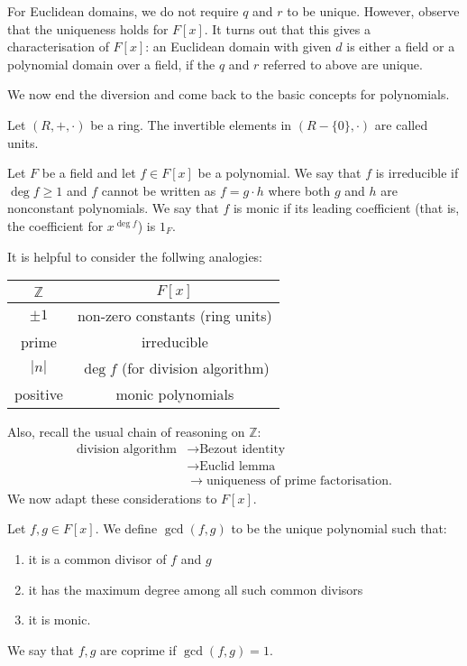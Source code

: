 \documentclass{scrartcl}
\def\ge{\geqslant}
\def\Z{\mathbb{Z}}
\begin{document}
\begin{remark}
	For Euclidean domains, we do not require $q$ and $r$ to be unique. However, observe that the uniqueness holds for $F[x]$. It turns out that this gives a characterisation of $F[x]$: an Euclidean domain with given $d$ is either a field or a polynomial domain over a field, if the $q$ and $r$ referred to above are unique. 
\end{remark} 
We now end the diversion and come back to the basic concepts for polynomials. 
\begin{definition}
	Let $(R, +, \cdot)$ be a ring. The invertible elements in $(R-\{0\}, \cdot)$ are called units. 
\end{definition}
\begin{definition}
	Let $F$ be a field and let $f \in F[x]$ be a polynomial. We say that $f$ is irreducible if $\deg{f} \ge 1$ and $f$ cannot be written as $f= g\cdot h$ where both $g$ and $h$ are nonconstant polynomials. We say that $f$ is monic if its leading coefficient (that is, the coefficient for $x^{\deg f}$) is $1_F$. 
\end{definition}
It is helpful to consider the follwing analogies:
\begin{center}
	\begin{tabular}{ c|c } 
		$\Z$ & $F[x]$ \\
		\hline
		$\pm 1$ & non-zero constants (ring units) \\ 
		prime & irreducible \\ 
		$|n|$ & $\deg{f}$ (for division algorithm) \\ 
		positive & monic polynomials
	\end{tabular}
\end{center}
Also, recall the usual chain of reasoning on $\Z$:
\begin{align*}
	\text{division algorithm} &\to \text{Bezout identity}  \\
	&\to \text{Euclid lemma} \\
	&\to \text{uniqueness of prime factorisation}.
\end{align*}
We now adapt these considerations to $F[x]$.
\begin{definition}
	Let $f, g \in F[x]$. We define $\gcd(f, g)$ to be the unique polynomial such that:
	\begin{enumerate}
		\item it is a common divisor of $f$ and $g$
		\item it has the maximum degree among all such common divisors
		\item it is monic.
	\end{enumerate}
	We say that $f, g$ are coprime if $\gcd(f, g)=1$.
\end{definition}
\end{document}
